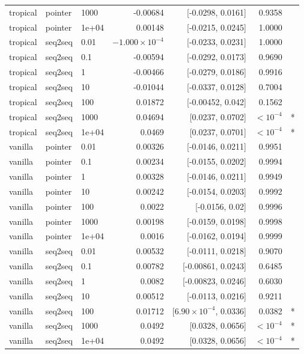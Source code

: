 \documentclass[10pt]{article}
\begin{document}
{\begin{longtable}{lllrrrl}
tropical & pointer & 1000 & -0.00684 & [-0.0298, 0.0161] & 0.9358 & \\
tropical & pointer & 1e+04 & 0.00148 & [-0.0215, 0.0245] & 1.0000 & \\
tropical & seq2seq & 0.01 & $-1.000\times10^{-4}$ & [-0.0233, 0.0231] & 1.0000 & \\
tropical & seq2seq & 0.1 & -0.00594 & [-0.0292, 0.0173] & 0.9690 & \\
tropical & seq2seq & 1 & -0.00466 & [-0.0279, 0.0186] & 0.9916 & \\
tropical & seq2seq & 10 & -0.01044 & [-0.0337, 0.0128] & 0.7004 & \\
tropical & seq2seq & 100 & 0.01872 & [-0.00452, 0.042] & 0.1562 & \\
tropical & seq2seq & 1000 & 0.04694 & [0.0237, 0.0702] & $<10^{-4}$ & *\\
tropical & seq2seq & 1e+04 & 0.0469 & [0.0237, 0.0701] & $<10^{-4}$ & *\\
vanilla & pointer & 0.01 & 0.00326 & [-0.0146, 0.0211] & 0.9951 & \\
vanilla & pointer & 0.1 & 0.00234 & [-0.0155, 0.0202] & 0.9994 & \\
vanilla & pointer & 1 & 0.00328 & [-0.0146, 0.0211] & 0.9949 & \\
vanilla & pointer & 10 & 0.00242 & [-0.0154, 0.0203] & 0.9992 & \\
vanilla & pointer & 100 & 0.0022 & [-0.0156, 0.02] & 0.9996 & \\
vanilla & pointer & 1000 & 0.00198 & [-0.0159, 0.0198] & 0.9998 & \\
vanilla & pointer & 1e+04 & 0.0016 & [-0.0162, 0.0194] & 0.9999 & \\
vanilla & seq2seq & 0.01 & 0.00532 & [-0.0111, 0.0218] & 0.9070 & \\
vanilla & seq2seq & 0.1 & 0.00782 & [-0.00861, 0.0243] & 0.6485 & \\
vanilla & seq2seq & 1 & 0.0082 & [-0.00823, 0.0246] & 0.6030 & \\
vanilla & seq2seq & 10 & 0.00512 & [-0.0113, 0.0216] & 0.9211 & \\
vanilla & seq2seq & 100 & 0.01712 & [$6.90\times10^{-4}$, 0.0336] & 0.0382 & *\\
vanilla & seq2seq & 1000 & 0.0492 & [0.0328, 0.0656] & $<10^{-4}$ & *\\
vanilla & seq2seq & 1e+04 & 0.0492 & [0.0328, 0.0656] & $<10^{-4}$ & *\\
\bottomrule
\end{longtable}
}
\end{document}
